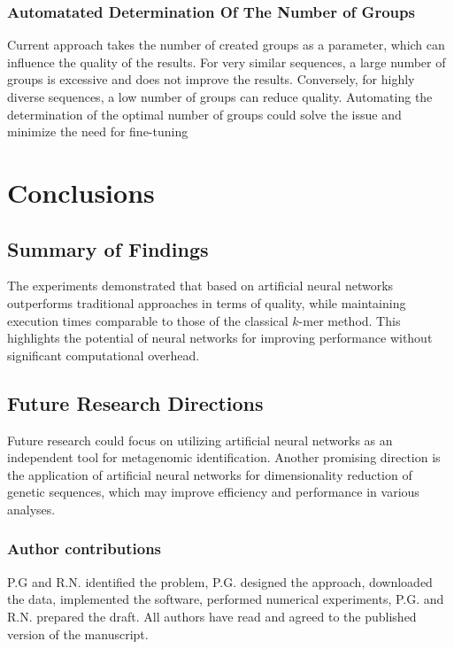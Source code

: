 \documentclass[pdflatex,sn-vancouver-num]{sn-jnl}%
\begin{document}
            \subsubsection{Automatated Determination Of The Number of Groups}
                Current approach takes the number of created groups as a parameter, which can influence the quality of the results. For very similar sequences, a large number of groups is excessive and does not improve the results. Conversely, for highly diverse sequences, a low number of groups can reduce quality. Automating the determination of the optimal number of groups could solve the issue and minimize the need for fine-tuning

    \section{Conclusions}
        \subsection{Summary of Findings}
            The experiments demonstrated that  based on artificial neural networks outperforms traditional approaches in terms of quality, while maintaining execution times comparable to those of the classical $k$-mer method. This highlights the potential of neural networks for improving performance without significant computational overhead.

        \subsection{Future Research Directions}
        Future research could focus on utilizing artificial neural networks as an independent tool for metagenomic identification. Another promising direction is the application of artificial neural networks for dimensionality reduction of genetic sequences, which may improve efficiency and performance in various analyses. 


\subsubsection*{Author contributions}

P.G and R.N. identified the problem, P.G. designed the approach, downloaded the data, implemented the software, performed numerical experiments, P.G. and R.N. prepared the draft. All authors have read and agreed to the published version of the manuscript.
\end{document}
